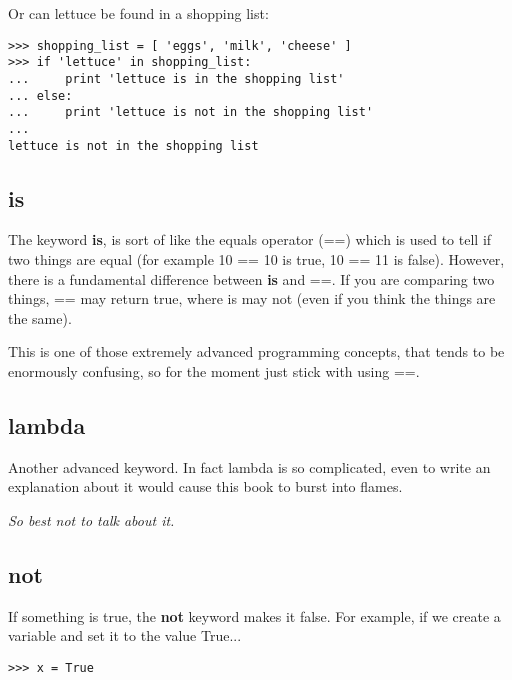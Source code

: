 \noindent
Or can lettuce be found in a shopping list:

\begin{listing}
\begin{verbatim}
>>> shopping_list = [ 'eggs', 'milk', 'cheese' ]
>>> if 'lettuce' in shopping_list:
...     print 'lettuce is in the shopping list'
... else:
...     print 'lettuce is not in the shopping list'
...
lettuce is not in the shopping list
\end{verbatim}
\end{listing}

\subsection*{is}

The keyword \textbf{is}, is sort of like the equals operator (==) which is used to tell if two things are equal (for example 10 == 10 is true, 10 == 11 is false).  However, there is a fundamental difference between \textbf{is} and ==. If you are comparing two things, == may return true, where is may not (even if you think the things are the same). 
\par
This is one of those extremely advanced programming concepts, that tends to be enormously confusing, so for the moment just stick with using ==.

\subsection*{lambda}

Another advanced keyword. In fact lambda is so complicated, even to write an explanation about it would cause this book to burst into flames.
\par
\emph{So best not to talk about it.}

\subsection*{not}

If something is true, the \textbf{not} keyword makes it false.  For example, if we create a variable  and set it to the value True...

\begin{listing}
\begin{verbatim}
>>> x = True
\end{verbatim}
\end{listing}


